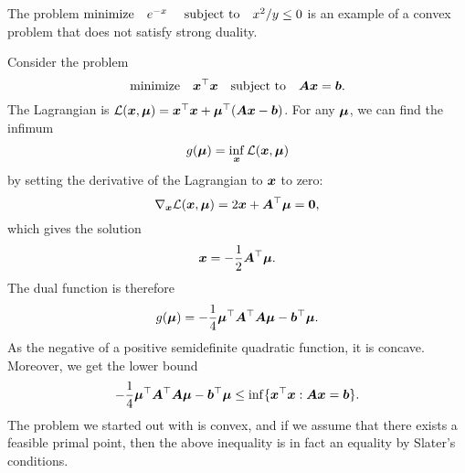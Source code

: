 \begin{example}
 The problem $\text{minimize}\quad e^{-x} \ \quad\text{subject to}\quad x^2/y\leq 0$ is an example of a convex problem that does not satisfy strong duality.
\end{example}

\begin{example}
 Consider the problem
 \begin{equation*}
  \text{minimize}\quad \bm{x}^{\top}\bm{x} \quad\text{subject to}\quad \bm{A}\bm{x}=\bm{b}.
 \end{equation*}
The Lagrangian is $\mathcal{L}(\bm{x},\bm{\mu})=\bm{x}^{\top}\bm{x}+\bm{\mu}^{\top}(\bm{A}\bm{x}-\bm{b})$. For any $\bm{\mu}$, we can find the infimum
\begin{equation*}
 g(\bm{\mu}) = \inf_{\bm{x}}\mathcal{L}(\bm{x},\bm{\mu})
\end{equation*}
by setting the derivative of the Lagrangian to $\bm{x}$ to zero:
\begin{equation*}
 \nabla_{\bm{x}}\mathcal{L}(\bm{x},\bm{\mu}) = 2\bm{x}+\bm{A}^{\top}\bm{\mu}=\bm{0},
\end{equation*}
which gives the solution
\begin{equation*}
 \bm{x} = -\frac{1}{2}\bm{A}^{\top}\bm{\mu}.
\end{equation*}
The dual function is therefore
\begin{equation*}
 g(\bm{\mu}) = -\frac{1}{4}\bm{\mu}^{\top}\bm{A}^{\top}\bm{A}\bm{\mu}-\bm{b}^{\top}\bm{\mu}.
\end{equation*}
As the negative of a positive semidefinite quadratic function, it is concave. Moreover, we get the lower bound
\begin{equation*}
 -\frac{1}{4}\bm{\mu}^{\top}\bm{A}^{\top}\bm{A}\bm{\mu}-\bm{b}^{\top}\bm{\mu}\leq \inf \{\bm{x}^{\top}\bm{x} \mathrel{\mathop{:}} \bm{A}\bm{x}=\bm{b}\}.
\end{equation*}
The problem we started out with is convex, and if we assume that there exists a feasible primal point, then the above inequality is in fact an equality by Slater's conditions.
\end{example}



